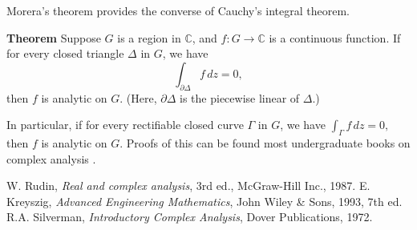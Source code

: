 \documentclass[12pt]{article}
\newcommand{\sC}[0]{\mathbb{C}}
\begin{document}
Morera's theorem provides the converse of Cauchy's integral theorem.  

{\bf Theorem} \cite{rudin_real}
Suppose $G$ is a region in $\sC$, and $f:G\to \sC$ is a continuous 
function. If for every closed triangle $\Delta$ in $G$, we have 
$$\int_{\partial \Delta} f\, dz = 0,$$
then $f$ is analytic on $G$. (Here, $\partial \Delta$ is the piecewise linear
 of $\Delta$.)

In particular, if for every rectifiable closed curve $\Gamma$ in $G$, we have 
$\int_{\Gamma} f\, dz = 0,$
then $f$ is analytic on $G$. Proofs of this can be found most
undergraduate books on complex analysis \cite{kreyszig93, silverman}.

\begin{thebibliography}{9}
 W. Rudin, \emph{Real and complex analysis}, 3rd ed., McGraw-Hill Inc., 1987.
  E. Kreyszig,
 \emph{Advanced Engineering Mathematics},
 John Wiley \& Sons, 1993, 7th ed.
 R.A. Silverman, \emph{Introductory Complex Analysis},
 Dover Publications, 1972.
 \end{thebibliography}
\end{document}
